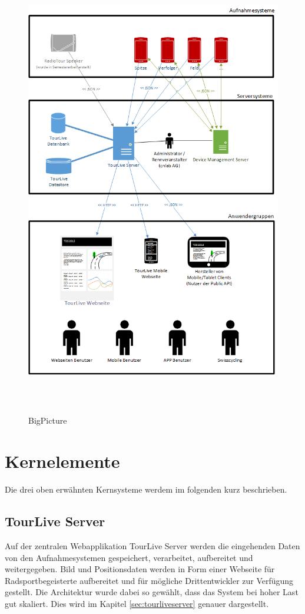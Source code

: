 \begin{figure}[H]
	\centering
	\includegraphics[height=200mm]{images/BigPicture.png}
	\caption{BigPicture}
\end{figure}

\pagebreak

\section{Kernelemente}
Die drei oben erwähnten Kernsysteme werdem im folgenden kurz beschrieben.

\subsection{TourLive Server}
Auf der zentralen Webapplikation TourLive Server werden die eingehenden Daten von den Aufnahmesystemen gespeichert, verarbeitet, aufbereitet und weitergegeben. Bild und Positionsdaten werden in Form einer Webseite für Radsportbegeisterte aufbereitet und für mögliche Drittentwickler zur Verfügung gestellt. Die Architektur wurde dabei so gewählt, dass das System bei hoher Last gut skaliert. Dies wird im Kapitel \ref{sec:tourliveserver} genauer dargestellt.


